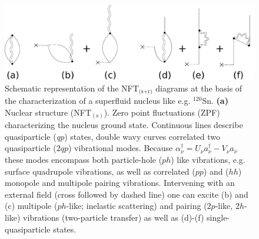 \begin{figure}[h!]
\begin{center}
\includegraphics[width=\textwidth]{introduccion/figs/fig1_4_2.pdf}
\caption{Schematic representation of the NFT$_{\text{(s+r)}}$ diagrams at the basis of the characterization of a superfluid nucleus like e.g. $^{120}$Sn. \textbf{(a)} Nuclear structure (NFT$_{(\text{s})}$). Zero point fluctuations (ZPF) characterizing the nucleus ground state. Continuous lines describe quasiparticle (\textit{qp}) states, double wavy curves correlated two quasiparticle ($2qp$) vibrational modes. Because $\alpha^{\dagger}_{\nu}=U_\nu a^\dagger_\nu-V_\nu a_{\bar{\nu}}$ these modes encompass both particle-hole ($ph$) like vibrations, e.g. surface quadrupole vibrations, as well as correlated ($pp$) and ($hh$) monopole and multipole pairing vibrations. Intervening with an external field (cross followed by dashed line) one can excite (b) and (c) multipole ($ph$-like; inelastic scattering) and  pairing ($2p$-like, $2h$-like) vibrations (two-particle transfer) as well as (d)-(f) single-quasiparticle states.}\label{fig1.4.2}
\end{center}
\end{figure}

